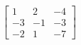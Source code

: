 %
\begin{align*}
\begin{bmatrix}
 1 & 2 & -4 \\
 -3 & -1 & -3 \\
 -2 & 1 & -7
\end{bmatrix}
\end{align*}
%
